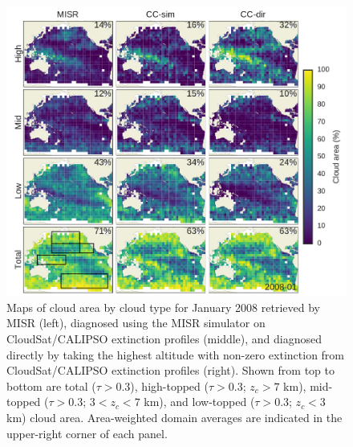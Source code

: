 \begin{figure}[tp]
\centering
\includegraphics{graphics/misr_cldmisr_maps_2008-01.pdf}
\caption{\label{fig:misr_cldmisr_maps_january}Maps of cloud area by
cloud type for January 2008 retrieved by MISR (left), diagnosed using
the MISR simulator on CloudSat/CALIPSO extinction profiles (middle), and
diagnosed directly by taking the highest altitude with non-zero
extinction from CloudSat/CALIPSO extinction profiles (right). Shown from
top to bottom are total (\(\tau > 0.3\)), high-topped (\(\tau > 0.3\);
\(z_c > 7\) km), mid-topped (\(\tau > 0.3\); \(3 < z_c < 7\) km), and
low-topped (\(\tau > 0.3\); \(z_c < 3\) km) cloud area. Area-weighted
domain averages are indicated in the upper-right corner of each
panel.}\label{fig:misrux5fcldmisrux5fmapsux5fjanuary}
\end{figure}

